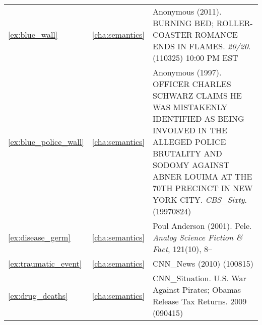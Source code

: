 \begin{longtable}{lcp{8.5cm}}
\ref{ex:blue_wall}&\ref{cha:semantics}&Anonymous (2011). BURNING BED; ROLLER-COASTER ROMANCE ENDS IN FLAMES. \emph{20/20}. (110325) 10:00 PM EST\\
\ref{ex:blue_police_wall}&\ref{cha:semantics}&Anonymous (1997). OFFICER CHARLES SCHWARZ CLAIMS HE WAS MISTAKENLY IDENTIFIED AS BEING INVOLVED IN THE ALLEGED POLICE BRUTALITY AND SODOMY AGAINST ABNER LOUIMA AT THE 70TH PRECINCT IN NEW YORK CITY. \emph{CBS\_Sixty}. (19970824)\\
\ref{ex:disease_germ}&\ref{cha:semantics}&Poul Anderson (2001). Pele. \emph{Analog Science Fiction \& Fact}, 121(10), 8--\\
\ref{ex:traumatic_event}&\ref{cha:semantics}&CNN\_News (2010) (100815) \\
\ref{ex:drug_deaths}&\ref{cha:semantics}&CNN\_Situation. U.S. War Against Pirates; Obamas Release Tax Returns. 2009 (090415)\\

\end{longtable}
